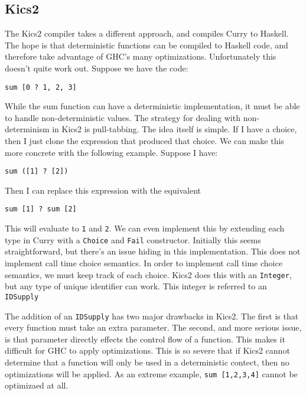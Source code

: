 \subsection{Kics2}

The Kics2 compiler takes a different approach, and compiles Curry to Haskell.
The hope is that deterministic functions can be compiled to Haskell code,
and therefore take advantage of GHC's many optimizations.
Unfortunately this doesn't quite work out.
Suppose we have the code:

\begin{verbatim}
sum [0 ? 1, 2, 3]
\end{verbatim}

While the sum function can have a deterministic implementation, 
it must be able to handle non-deterministic values.
The strategy for dealing with non-determinism in Kics2 is pull-tabbing.
The idea itself is simple.  If I have a choice, then I just clone the expression that produced that choice.
We can make this more concrete with the following example.
Suppose I have:
\begin{verbatim}
sum ([1] ? [2])
\end{verbatim}
Then I can replace this expression with the equivalent
\begin{verbatim}
sum [1] ? sum [2]
\end{verbatim}
This will evaluate to \texttt 1 and \texttt 2.
We can even implement this by extending each type in Curry with a \texttt{Choice} and \texttt{Fail} constructor.
Initially this seems straightforward, but there's an issue hiding in this implementation.
This does not implement call time choice semantics.
In order to implement call time choice semantics, we must keep track of each choice.
Kics2 does this with an \texttt{Integer}, but any type of unique identifier can work.
This integer is referred to an \texttt{IDSupply}

The addition of an \texttt{IDSupply} has two major drawbacks in Kics2.
The first is that every function must take an extra parameter.
The second, and more serious issue, is that parameter directly effects the control flow of a function.
This makes it difficult for GHC to apply optimizations.
This is so severe that if Kics2 cannot determine that a  function will only be used in a deterministic contect,
then no optimizations will be applied.
As an extreme example, \texttt{sum [1,2,3,4]} cannot be optimizaed at all.


